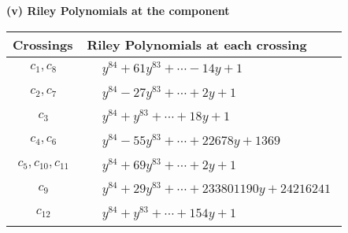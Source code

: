 \documentclass[1p]{elsarticle_modified}
\theoremstyle{definition}
\begin{document}
\newpage\renewcommand{\arraystretch}{1}
\flushleft \textbf{(v) Riley Polynomials at the component}\newline \\
\begin{tabular}{m{50pt}|m{274pt}}
Crossings & \hspace{64pt}Riley Polynomials at each crossing \\
\hline $$\begin{aligned}c_{1},c_{8}\end{aligned}$$&$\begin{aligned}
&y^{84}+61 y^{83}+\cdots-14 y+1
\end{aligned}$\\
\hline $$\begin{aligned}c_{2},c_{7}\end{aligned}$$&$\begin{aligned}
&y^{84}-27 y^{83}+\cdots+2 y+1
\end{aligned}$\\
\hline $$\begin{aligned}c_{3}\end{aligned}$$&$\begin{aligned}
&y^{84}+y^{83}+\cdots+18 y+1
\end{aligned}$\\
\hline $$\begin{aligned}c_{4},c_{6}\end{aligned}$$&$\begin{aligned}
&y^{84}-55 y^{83}+\cdots+22678 y+1369
\end{aligned}$\\
\hline $$\begin{aligned}c_{5},c_{10},c_{11}\end{aligned}$$&$\begin{aligned}
&y^{84}+69 y^{83}+\cdots+2 y+1
\end{aligned}$\\
\hline $$\begin{aligned}c_{9}\end{aligned}$$&$\begin{aligned}
&y^{84}+29 y^{83}+\cdots+233801190 y+24216241
\end{aligned}$\\
\hline $$\begin{aligned}c_{12}\end{aligned}$$&$\begin{aligned}
&y^{84}+y^{83}+\cdots+154 y+1
\end{aligned}$\\
\hline
\end{tabular}\\~\\
\end{document}
